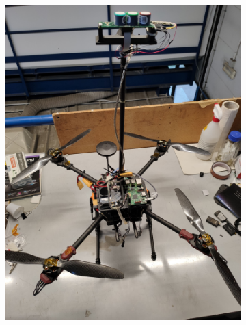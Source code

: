 \begin{figure}[!ht]
    \centering
    \begin{subfigure}[b]{0.32\textwidth}
        \centering
        \includegraphics[width=\textwidth, angle=-90]{images/drone/IMG_20211105_103832.jpg}
        \caption{}
        \label{fig:wide}
    \end{subfigure}
    \begin{subfigure}[b]{0.32\textwidth}
        \centering

\end{subfigure}
\end{figure}
